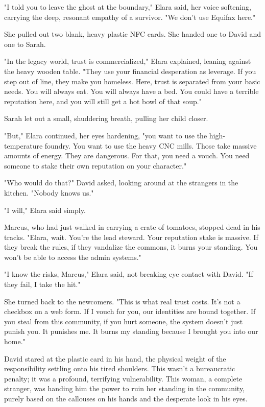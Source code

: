 "I told you to leave the ghost at the boundary," Elara said, her voice softening, carrying the deep, resonant empathy of a survivor. "We don't use Equifax here."

She pulled out two blank, heavy plastic NFC cards. She handed one to David and one to Sarah.

"In the legacy world, trust is commercialized," Elara explained, leaning against the heavy wooden table. "They use your financial desperation as leverage. If you step out of line, they make you homeless. Here, trust is separated from your basic needs. You will always eat. You will always have a bed. You could have a terrible reputation here, and you will still get a hot bowl of that soup."

Sarah let out a small, shuddering breath, pulling her child closer. 

"But," Elara continued, her eyes hardening, "you want to use the high-temperature foundry. You want to use the heavy CNC mills. Those take massive amounts of energy. They are dangerous. For that, you need a vouch. You need someone to stake their own reputation on your character."

"Who would do that?" David asked, looking around at the strangers in the kitchen. "Nobody knows us."

"I will," Elara said simply.

Marcus, who had just walked in carrying a crate of tomatoes, stopped dead in his tracks. "Elara, wait. You’re the lead steward. Your reputation stake is massive. If they break the rules, if they vandalize the commons, it burns your standing. You won't be able to access the admin systems."

"I know the risks, Marcus," Elara said, not breaking eye contact with David. "If they fail, I take the hit."

She turned back to the newcomers. "This is what real trust costs. It's not a checkbox on a web form. If I vouch for you, our identities are bound together. If you steal from this community, if you hurt someone, the system doesn't just punish you. It punishes me. It burns my standing because I brought you into our home."

David stared at the plastic card in his hand, the physical weight of the responsibility settling onto his tired shoulders. This wasn't a bureaucratic penalty; it was a profound, terrifying vulnerability. This woman, a complete stranger, was handing him the power to ruin her standing in the community, purely based on the callouses on his hands and the desperate look in his eyes.

